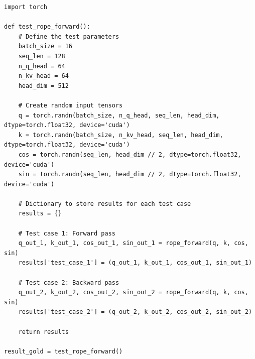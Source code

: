 \begin{mdframed}[linewidth=1pt, linecolor=black, backgroundcolor=gray!5]
\begin{lstlisting}
import torch

def test_rope_forward():
    # Define the test parameters
    batch_size = 16
    seq_len = 128
    n_q_head = 64
    n_kv_head = 64
    head_dim = 512

    # Create random input tensors
    q = torch.randn(batch_size, n_q_head, seq_len, head_dim, dtype=torch.float32, device='cuda')
    k = torch.randn(batch_size, n_kv_head, seq_len, head_dim, dtype=torch.float32, device='cuda')
    cos = torch.randn(seq_len, head_dim // 2, dtype=torch.float32, device='cuda')
    sin = torch.randn(seq_len, head_dim // 2, dtype=torch.float32, device='cuda')

    # Dictionary to store results for each test case
    results = {}

    # Test case 1: Forward pass
    q_out_1, k_out_1, cos_out_1, sin_out_1 = rope_forward(q, k, cos, sin)
    results['test_case_1'] = (q_out_1, k_out_1, cos_out_1, sin_out_1)

    # Test case 2: Backward pass
    q_out_2, k_out_2, cos_out_2, sin_out_2 = rope_forward(q, k, cos, sin)
    results['test_case_2'] = (q_out_2, k_out_2, cos_out_2, sin_out_2)

    return results

result_gold = test_rope_forward()

\end{lstlisting}
\end{mdframed}

